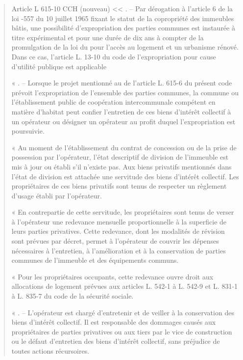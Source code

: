 		\begin{quote}
			Article L 615-10 CCH (nouveau)
			<< \I. – Par dérogation à l’article 6 de la loi -557 du 10 juillet 1965 fixant le statut de
			la copropriété des immeubles bâtis, une possibilité d’expropriation des parties
			communes est instaurée à titre expérimental et pour une durée de dix ans à compter de
			la promulgation de la loi \no du pour l’accès au logement et un urbanisme
			rénové. Dans ce cas, l’article L. 13-10 du code de l’expropriation pour cause d’utilité
			publique est applicable
			
			\medskip
			« \II. – Lorsque le projet mentionné au \V{} de l’article L. 615-6 du présent code prévoit
			l’expropriation de l’ensemble des parties communes, la commune ou l’établissement
			public de coopération intercommunale compétent en matière d’habitat peut confier
			l’entretien de ces biens d’intérêt collectif à un opérateur ou désigner un opérateur au
			profit duquel l’expropriation est poursuivie.
			
			« Au moment de l’établissement du contrat de concession ou de la prise de
			possession par l’opérateur, l’état descriptif de division de l’immeuble est mis à jour ou
			établi s’il n’existe pas. Aux biens privatifs mentionnés dans l’état de division est attachée
			une servitude des biens d’intérêt collectif. Les propriétaires de ces biens privatifs sont
			tenus de respecter un règlement d’usage établi par l’opérateur.
			
			« En contrepartie de cette servitude, les propriétaires sont tenus de verser à
			l’opérateur une redevance mensuelle proportionnelle à la superficie de leurs parties
			privatives. Cette redevance, dont les modalités de révision sont prévues par décret,
			permet à l’opérateur de couvrir les dépenses nécessaires à l’entretien, à l’amélioration
			et à la conservation de parties communes de l’immeuble et des équipements communs.
			
			« Pour les propriétaires occupants, cette redevance ouvre droit aux allocations de
			logement prévues aux articles L. 542-1 à L. 542-9 et L. 831-1 à L. 835-7 du code de la
			sécurité sociale.
			
			\medskip
			« \III. – L’opérateur est chargé d’entretenir et de veiller à la conservation des biens
			d’intérêt collectif. Il est responsable des dommages causés aux propriétaires de parties
			privatives ou aux tiers par le vice de construction ou le défaut d’entretien des biens
			d’intérêt collectif, sans préjudice de toutes actions récursoires.
			

\end{quote}
